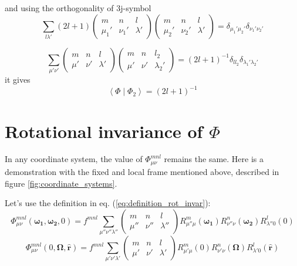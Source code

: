and using the orthogonality of 3j-symbol \citep{Edmonds}
\begin{equation}
\sum_{l\lambda'}\left(2l+1\right)\left(\begin{array}{ccc}
m & n & l\\
\mu_{1}' & \nu_{1}' & \lambda'
\end{array}\right)\left(\begin{array}{ccc}
m & n & l\\
\mu_{2}' & \nu_{2}' & \lambda'
\end{array}\right)=\delta_{\mu_{1}'\mu_{2}'}\delta_{\nu_{1}'\nu_{2}'}
\end{equation}


\begin{equation}
\sum_{\mu'\nu'}\left(\begin{array}{ccc}
m & n & l\\
\mu' & \nu' & \lambda'
\end{array}\right)\left(\begin{array}{ccc}
m & n & l_{2}\\
\mu' & \nu' & \lambda_{2}'
\end{array}\right)=\left(2l+1\right)^{-1}\delta_{ll_{2}}\delta_{\lambda_{1}'\lambda_{2}'}
\end{equation}
it gives
\begin{equation}
\left\langle \Phi\mid\Phi_{2}\right\rangle =\left(2l+1\right)^{-1}
\end{equation}



\section{Rotational invariance of $\Phi$}

In any coordinate system, the value of $\Phi_{\mu\nu}^{mnl}$ remains
the same. Here is a demonstration with the fixed and local
frame mentioned above, described in figure \ref{fig:coordinate_systems}.

Let's use the definition in eq. (\ref{eq:definition_rot_invar}):
\begin{equation}
\Phi_{\mu\nu}^{mnl}(\boldsymbol{\omega_{1}},\boldsymbol{\omega_{2}},0)=f^{mnl}\sum_{\mu''\nu''\lambda''}\left(\begin{array}{ccc}
m & n & l\\
\mu'' & \nu'' & \lambda''
\end{array}\right)R_{\mu''\mu}^{m}(\boldsymbol{\omega_{1}})R_{\nu''\nu}^{n}(\boldsymbol{\omega_{2}})R_{\lambda''0}^{l}(0)
\end{equation}
\begin{equation}
\Phi_{\mu\nu}^{mnl}(0,\mathbf{\Omega},\mathbf{\hat{r}})=f^{mnl}\sum_{\mu'\nu'\lambda'}\left(\begin{array}{ccc}
m & n & l\\
\mu' & \nu' & \lambda'
\end{array}\right)R_{\mu'\mu}^{m}(0)R_{\nu'\nu}^{n}(\mathbf{\Omega})R_{\lambda'0}^{l}(\mathbf{\hat{r}})
\end{equation}


